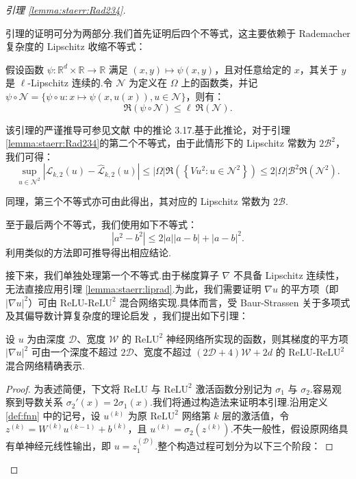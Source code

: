 \begin{proof}[引理 \ref{lemma:staerr:Rad234}]\label{pf:lemma:staerr:Rad234}

引理的证明可分为两部分.我们首先证明后四个不等式，这主要依赖于 Rademacher 复杂度的 Lipschitz 收缩不等式：
\begin{lemma}\label{lemma:staerr:liprad}
假设函数 $\psi:\mathbb{R}^{d}\times\mathbb{R}\rightarrow\mathbb{R}$ 满足 $(x,y)\mapsto\psi(x,y)$，且对任意给定的 $x$，其关于 $y$ 是 $\ell$-Lipschitz 连续的.令 $\mathcal{N}$ 为定义在 $\Omega$ 上的函数类，并记 $\psi\circ\mathcal{N}=\{\psi\circ u:x\mapsto\psi(x,u(x)), u\in\mathcal{N}\}$，则有：
$$ \mathfrak{R}(\psi\circ\mathcal{N})\leq\ell \ \mathfrak{R}(\mathcal{N}). $$
\end{lemma}
该引理的严谨推导可参见文献 \cite{ledoux2013probability} 中的推论 3.17.基于此推论，对于引理\ref{lemma:staerr:Rad234}的第二个不等式，由于此情形下的 Lipschitz 常数为 $2\mathcal{B}^{2}$，我们可得：
$$ \sup _{u \in \mathcal{N}^{2}}\left|\mathcal{L}_{k, 2}(u)-\widehat{\mathcal{L}}_{k, 2}(u)\right| \leq |\Omega|\mathfrak{R}\left(\left\{V u^{2}:u\in \mathcal{N}^{2}\right\}\right) \leq 2|\Omega|\mathcal{B}^{2}\mathfrak{R}\left(\mathcal{N}^{2}\right). $$

同理，第三个不等式亦可由此得出，其对应的 Lipschitz 常数为 $2\mathcal{B}$.

至于最后两个不等式，我们使用如下不等式： 
\begin{equation*} 
|a^{2}-b^{2}|\leq 2|a||a-b|+|a-b|^{2}. 
\end{equation*}
利用类似的方法即可推导得出相应结论.

接下来，我们单独处理第一个不等式.由于梯度算子 $\nabla$ 不具备 Lipschitz 连续性，无法直接应用引理 \ref{lemma:staerr:liprad}.为此，我们需要证明 $\nabla u$ 的平方项（即 $|\nabla u|^2$）可由 $\mathrm{ReLU}$-$\mathrm{ReLU}^{2}$ 混合网络实现.具体而言，受 Baur-Strassen 关于多项式及其偏导数计算复杂度的理论启发 \cite{baur1983complexity}，我们提出如下引理：

\begin{lemma}\label{lem:gradcomplexity}
设 $u$ 为由深度 $\mathcal{D}$、宽度 $\mathcal{W}$ 的 $\mathrm{ReLU}^{2}$ 神经网络所实现的函数，则其梯度的平方项 $|\nabla u|^2$ 可由一个深度不超过 $2\mathcal{D}$、宽度不超过 $(2\mathcal{D}+4)\mathcal{W} + 2d$ 的 $\mathrm{ReLU}$-$\mathrm{ReLU}^{2}$ 混合网络精确表示.
\end{lemma}

\begin{proof}
为表述简便，下文将 $\mathrm{ReLU}$ 与 $\mathrm{ReLU}^{2}$ 激活函数分别记为 $\sigma_1$ 与 $\sigma_2$.容易观察到导数关系 $\sigma_2'(x)=2\sigma_1(x)$.我们将通过构造法来证明本引理.沿用定义 \ref{def:fnn} 中的记号，设 $u^{(k)}$ 为原 $\mathrm{ReLU}^{2}$ 网络第 $k$ 层的激活值，令 $z^{(k)} = W^{(k)}u^{(k-1)} + b^{(k)}$，且 $u^{(k)}=\sigma_2(z^{(k)})$.不失一般性，假设原网络具有单神经元线性输出，即 $u = z_1^{(\mathcal{D})}$.整个构造过程可划分为以下三个阶段：


\end{proof}
\end{proof}

